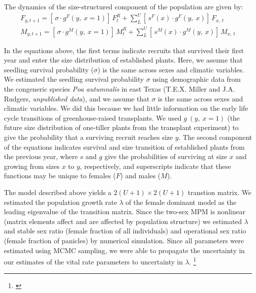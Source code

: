 \documentclass[12pt]{article}\usepackage[]{graphicx}\usepackage[dvipsnames]{xcolor}
\newcommand{\tom}[2]{{\color{red}{#1}}\footnote{\textit{\color{red}{#2}}}}
\begin{document}
The dynamics of the size-structured component of the population are given by:
\begin{align}\label{eq:dynamics}
F_{y,t+1} = [ \, \sigma \cdot g^{F}(y,\ x=1) ] \, F^{R}_{t} + \sum_{L}^{U} 	[ \, s^{F}(x) \cdot g^{F}(y,\ x)] \, F_{x,\ t}
\\
M_{y,t+1} = [ \, \sigma \cdot g^{M}(y,\ x=1) ] \, M^{R}_{t} + \sum_{L}^{U} 	[ \,  s^{M}(x) \cdot g^{M}(y,\ x) ] \, M_{x,\ t}
\end{align}

\noindent In the equations above, the first terms indicate recruits that survived their first year and enter the size distribution of established plants.
Here, we assume that seedling survival probability ($\sigma$) is the same across sexes and climatic variables.
We estimated the seedling survival probability $\sigma$ using demographic data from the congeneric species \textit{Poa autumnalis} in east Texas (T.E.X. Miller and J.A. Rudgers, \textit{unpublished data}), and we assume that $\sigma$ is the same across sexes and climatic variables. 
We did this because we had little information on the early life cycle transitions of greenhouse-raised transplants.
We used $g\ (y,\ x=1)$ (the future size distribution of one-tiller plants from the transplant experiment) to give the probability that a surviving recruit reaches size $y$.
The second component of the equations indicates survival and size transition of established plants from the previous year, where $s$ and $g$ give the probabilities of surviving at size $x$ and growing from sizes $x$ to $y$, respectively, and superscripts indicate that these functions may be unique to females ($F$) and males ($M$).

The model described above yields a $2(U+1) \times 2(U+1)$ transtion matrix. 
We estimated the population growth rate $\lambda$ of the female dominant model as the leading eigenvalue of the transition matrix. 
Since the two-sex MPM is nonlinear (matrix elements affect and are affected by population structure) we estimated $\lambda$ and stable sex ratio (female fraction of all individuals) and operational sex ratio (female fraction of panicles) by numerical simulation.
Since all parameters were estimated using MCMC sampling, we were able to propagate the uncertainty in our estimates of the vital rate parameters to uncertainty in $\lambda$. 
\tom{Furthermore, by sampling over distributions associated with site, block, and source population variance terms, we are able to additionally incorporate process error into the total uncertainty in $\lambda$.}{I just want to confirm that this is actually what you did.}
\end{document}
